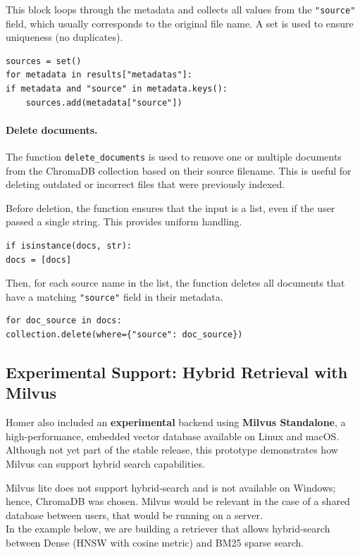 \documentclass[11pt,a4paper]{report}
\begin{document}
This block loops through the metadata and collects all values from the \texttt{"source"} field, which usually corresponds to the original file name. A set is used to ensure uniqueness (no duplicates).
\begin{lstlisting}
sources = set()
for metadata in results["metadatas"]:
if metadata and "source" in metadata.keys():
    sources.add(metadata["source"])
\end{lstlisting}

\paragraph{Delete documents.}
The function \texttt{delete\_documents} is used to remove one or multiple documents from the ChromaDB collection based on their source filename. This is useful for deleting outdated or incorrect files that were previously indexed.

Before deletion, the function ensures that the input is a list, even if the user passed a single string. This provides uniform handling.
\begin{lstlisting}
if isinstance(docs, str):
docs = [docs]
\end{lstlisting}

Then, for each source name in the list, the function deletes all documents that have a matching \texttt{"source"} field in their metadata.
\begin{lstlisting}
for doc_source in docs:
collection.delete(where={"source": doc_source})
\end{lstlisting}


\subsection{Experimental Support: Hybrid Retrieval with Milvus}

Homer also included an \textbf{experimental} backend using \textbf{Milvus Standalone}, a high-performance, embedded vector database available on Linux and macOS. Although not yet part of the stable release, this prototype demonstrates how Milvus can support hybrid search capabilities.

Milvus lite does not support hybrid-search and is not available on Windows; hence, ChromaDB was chosen. Milvus would be relevant in the case of a shared database between users, that would be running on a server.\\
In the example below, we are building a retriever that allows hybrid-search between Dense (HNSW with cosine metric) and BM25 sparse search.
\end{document}
